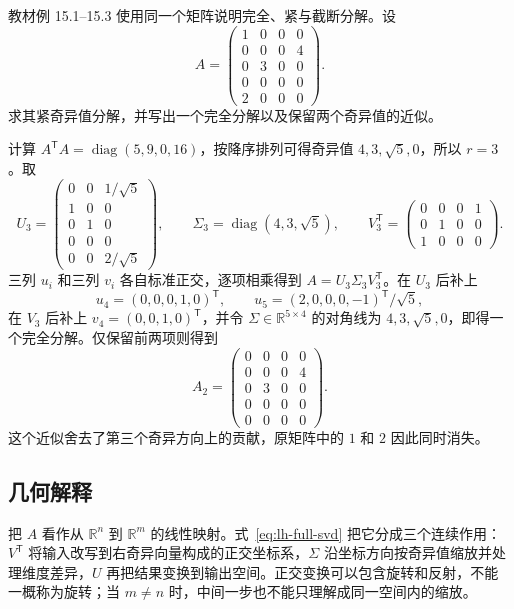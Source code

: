 \begin{example}
\label{ex:lh-svd-five-by-four}
教材例 15.1--15.3 使用同一个矩阵说明完全、紧与截断分解。设
\[
A=\begin{pmatrix}
1&0&0&0\\
0&0&0&4\\
0&3&0&0\\
0&0&0&0\\
2&0&0&0
\end{pmatrix}.
\]
求其紧奇异值分解，并写出一个完全分解以及保留两个奇异值的近似。
\end{example}
\begin{solve}
计算 $A^{\mathsf T}A=\operatorname{diag}(5,9,0,16)$，按降序排列可得奇异值 $4,3,\sqrt5,0$，所以 $r=3$。取
\[
U_3=\begin{pmatrix}
0&0&1/\sqrt5\\
1&0&0\\
0&1&0\\
0&0&0\\
0&0&2/\sqrt5
\end{pmatrix},\qquad
\Sigma_3=\operatorname{diag}(4,3,\sqrt5),\qquad
V_3^{\mathsf T}=\begin{pmatrix}0&0&0&1\\0&1&0&0\\1&0&0&0\end{pmatrix}.
\]
三列 $u_i$ 和三列 $v_i$ 各自标准正交，逐项相乘得到 $A=U_3\Sigma_3V_3^{\mathsf T}$。在 $U_3$ 后补上
\[
u_4=(0,0,0,1,0)^{\mathsf T},\qquad
u_5=(2,0,0,0,-1)^{\mathsf T}/\sqrt5,
\]
在 $V_3$ 后补上 $v_4=(0,0,1,0)^{\mathsf T}$，并令 $\Sigma\in\mathbb R^{5\times4}$ 的对角线为 $4,3,\sqrt5,0$，即得一个完全分解。仅保留前两项则得到
\begin{equation}
A_2=\begin{pmatrix}
0&0&0&0\\
0&0&0&4\\
0&3&0&0\\
0&0&0&0\\
0&0&0&0
\end{pmatrix}.
\label{eq:lh-svd-five-by-four-rank-two}
\end{equation}
这个近似舍去了第三个奇异方向上的贡献，原矩阵中的 $1$ 和 $2$ 因此同时消失。
\end{solve}

\subsection{几何解释}
\label{subsec:lh-svd-geometry}

把 $A$ 看作从 $\mathbb R^n$ 到 $\mathbb R^m$ 的线性映射。式~\eqref{eq:lh-full-svd} 把它分成三个连续作用：$V^{\mathsf T}$ 将输入改写到右奇异向量构成的正交坐标系，$\Sigma$ 沿坐标方向按奇异值缩放并处理维度差异，$U$ 再把结果变换到输出空间。正交变换可以包含旋转和反射，不能一概称为旋转；当 $m\ne n$ 时，中间一步也不能只理解成同一空间内的缩放。

